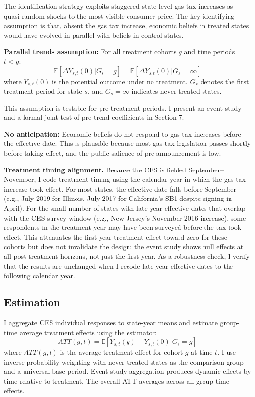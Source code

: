 \documentclass[12pt]{article}
\newcommand{\E}{\mathbb{E}}
\begin{document}
The identification strategy exploits staggered state-level gas tax increases as quasi-random shocks to the most visible consumer price. The key identifying assumption is that, absent the gas tax increase, economic beliefs in treated states would have evolved in parallel with beliefs in control states.

\textbf{Parallel trends assumption:} For all treatment cohorts $g$ and time periods $t < g$:
\begin{equation}
\E[\Delta Y_{s,t}(0) | G_s = g] = \E[\Delta Y_{s,t}(0) | G_s = \infty]
\end{equation}
where $Y_{s,t}(0)$ is the potential outcome under no treatment, $G_s$ denotes the first treatment period for state $s$, and $G_s = \infty$ indicates never-treated states.

This assumption is testable for pre-treatment periods. I present an event study and a formal joint test of pre-trend coefficients in Section 7.

\textbf{No anticipation:} Economic beliefs do not respond to gas tax increases before the effective date. This is plausible because most gas tax legislation passes shortly before taking effect, and the public salience of pre-announcement is low.

\textbf{Treatment timing alignment.} Because the CES is fielded September--November, I code treatment timing using the calendar year in which the gas tax increase took effect. For most states, the effective date falls before September (e.g., July 2019 for Illinois, July 2017 for California's SB1 despite signing in April). For the small number of states with late-year effective dates that overlap with the CES survey window (e.g., New Jersey's November 2016 increase), some respondents in the treatment year may have been surveyed before the tax took effect. This attenuates the first-year treatment effect toward zero for these cohorts but does not invalidate the design: the event study shows null effects at all post-treatment horizons, not just the first year. As a robustness check, I verify that the results are unchanged when I recode late-year effective dates to the following calendar year.

\subsection{Estimation}

I aggregate CES individual responses to state-year means and estimate group-time average treatment effects using the \citet{callaway2021difference} estimator:
\begin{equation}
ATT(g,t) = \E[Y_{s,t}(g) - Y_{s,t}(0) | G_s = g]
\end{equation}
where $ATT(g,t)$ is the average treatment effect for cohort $g$ at time $t$. I use inverse probability weighting with never-treated states as the comparison group and a universal base period. Event-study aggregation produces dynamic effects by time relative to treatment. The overall ATT averages across all group-time effects.
\end{document}

